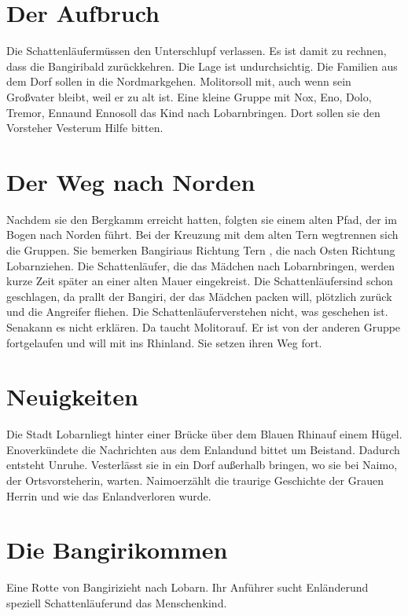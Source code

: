 \documentclass[12pt,a4paper,onecolumn,twoside,ngerman]{book}
\newcommand{\Tern}{Tern }
\newcommand{\Molitor}{Molitor}
\newcommand{\Ternweg}{{\Tern}weg}
\newcommand{\Sena}{Sena}
\newcommand{\Bangiri}{Bangiri}
\newcommand{\Enland}{Enland}
\newcommand{\Enlaender}{Enländer}
\newcommand{\Schattenlaufer}{Schattenläufer}
\newcommand{\Eno}{Eno}
\newcommand{\Dolo}{Dolo}
\newcommand{\Nox}{Nox}
\newcommand{\Enna}{Enna}
\newcommand{\Enno}{Enno}
\newcommand{\Tremor}{Tremor}
\newcommand{\Lobarn}{Lobarn}
\newcommand{\Vester}{Vester}
\newcommand{\Naimo}{Naimo}
\newcommand{\Nordmark}{Nordmark}
\newcommand{\Rhinland}{Rhinland}
\newcommand{\Rhin}{Rhin}
\begin{document}
\section{Der Aufbruch}
Die \Schattenlaufer müssen den Unterschlupf verlassen. Es ist damit zu rechnen, dass die \Bangiri bald zurückkehren. Die Lage ist undurchsichtig. Die Familien aus dem Dorf sollen in die \Nordmark gehen. \Molitor soll mit, auch wenn sein Großvater bleibt, weil er zu alt ist.
Eine kleine Gruppe mit \Nox , \Eno , \Dolo , \Tremor , \Enna und \Enno soll das Kind nach \Lobarn bringen. Dort sollen sie den Vorsteher \Vester um Hilfe bitten.

\section{Der Weg nach Norden}
Nachdem sie den Bergkamm erreicht hatten, folgten sie einem alten Pfad, der im Bogen nach Norden führt. Bei der Kreuzung mit dem alten \Ternweg trennen sich die Gruppen. Sie bemerken \Bangiri aus Richtung \Tern, die nach Osten Richtung \Lobarn ziehen. Die \Schattenlaufer, die das Mädchen nach \Lobarn bringen, werden kurze Zeit später an einer alten Mauer eingekreist. Die \Schattenlaufer sind schon geschlagen, da prallt der \Bangiri, der das Mädchen packen will, plötzlich zurück und die Angreifer fliehen. Die \Schattenlaufer verstehen nicht, was geschehen ist. \Sena kann es nicht erklären. Da taucht \Molitor auf. Er ist von der anderen Gruppe fortgelaufen und will mit ins \Rhinland{.} Sie setzen ihren Weg fort.

\section{Neuigkeiten}
Die Stadt \Lobarn liegt hinter einer Brücke über dem Blauen \Rhin auf einem Hügel.
\Eno verkündete die Nachrichten aus dem \Enland und bittet um Beistand. Dadurch entsteht Unruhe. \Vester lässt sie in ein Dorf außerhalb bringen, wo sie bei \Naimo, der Ortsvorsteherin, warten. \Naimo erzählt die traurige Geschichte der Grauen Herrin und wie das \Enland verloren wurde.

\section{Die \Bangiri kommen}
Eine Rotte von \Bangiri zieht nach \Lobarn. Ihr Anführer sucht \Enlaender und speziell \Schattenlaufer und das Menschenkind. 
\end{document}
